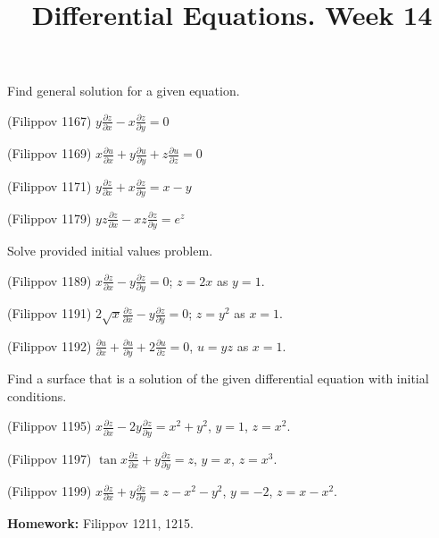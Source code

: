 \documentclass[14pt]{exam}
\title{Differential Equations. Week 14}
\date{}
\begin{document}
	\maketitle
	
	Find general solution for a given equation.
	
	\begin{questions}
		\question
		(Filippov 1167)
		$
			y\frac{\partial z}{\partial x} - x \frac{\partial z}{\partial y} = 0
		$
		
		\question
		(Filippov 1169)
		$
			x \frac{\partial u}{\partial x} + y \frac{\partial u}{\partial y} + z \frac{\partial u}{\partial z} = 0
		$
		
		\question
		(Filippov 1171)
		$
			y\frac{\partial z}{\partial x} + x \frac{\partial z}{\partial y} = x - y
		$
		
		\question
		(Filippov 1179)
		$
			yz \frac{\partial z}{\partial x} - xz \frac{\partial z}{\partial y}  = e^z
		$
		
	\end{questions}
	
	Solve provided initial values problem.
	
	\begin{questions}
		\setcounter{question}{4}
		\question
		(Filippov 1189)
		$
			x\frac{\partial z}{\partial x} - y \frac{\partial z}{\partial y} = 0
		$; $z = 2x$ as $y = 1$.
		
		\question
		(Filippov 1191)
		$
			2\sqrt{x} \frac{\partial z}{\partial x} - y \frac{\partial z}{\partial y} = 0
		$; $z = y^2$ as $x = 1$.
		
		\question
		(Filippov 1192)
		$
			\frac{\partial u}{\partial x} + \frac{\partial u}{\partial y} + 2 \frac{\partial u}{\partial z} = 0
		$, $u=yz$ as $x=1$.
	\end{questions}
	
	Find a surface that is a solution of the given differential equation with initial conditions.
	
	\begin{questions}
		\setcounter{question}{7}
		\question
		(Filippov 1195)
		$
			x \frac{\partial z}{\partial x} - 2y \frac{\partial z}{\partial y} = x^2 + y^2
		$, $y = 1$, $z = x^2$.
		
		\question
		(Filippov 1197)
		$
			\tan{x} \frac{\partial z}{\partial x} + y \frac{\partial z}{\partial y} = z
		$, $y = x$, $z = x^3$.
		
		\question
		(Filippov 1199)
		$
			x \frac{\partial z}{\partial x} + y \frac{\partial z}{\partial y} = z - x^2 - y^2
		$, $y = -2$, $z = x - x^2$.
	\end{questions}

	
	\textbf{Homework:} Filippov 1211, 1215.
\end{document}
